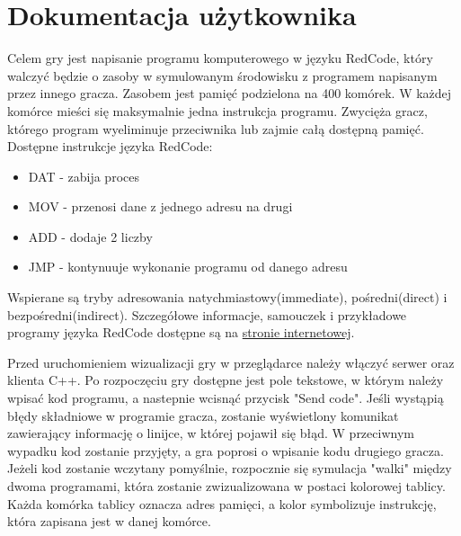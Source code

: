 \chapter{Dokumentacja użytkownika}
Celem gry jest napisanie programu komputerowego w języku RedCode, który walczyć będzie o zasoby w symulowanym środowisku z programem napisanym przez innego gracza. Zasobem jest pamięć podzielona na 400 komórek. W każdej komórce mieści się maksymalnie jedna instrukcja programu. Zwycięża gracz, którego program wyeliminuje przeciwnika lub zajmie całą dostępną pamięć.
Dostępne instrukcje języka RedCode:
\begin{itemize}
\item DAT - zabija proces
\item MOV - przenosi dane z jednego adresu na drugi
\item ADD - dodaje 2 liczby
\item JMP - kontynuuje wykonanie programu od danego adresu
\end{itemize}
Wspierane są tryby adresowania natychmiastowy(immediate), pośredni(direct) i bezpośredni(indirect). Szczegółowe informacje, samouczek i przykładowe programy języka RedCode dostępne są na \href{http://vyznev.net/corewar/guide.html}{stronie internetowej}.

Przed uruchomieniem wizualizacji gry w przeglądarce należy włączyć serwer oraz klienta C++. Po rozpoczęciu gry dostępne jest pole tekstowe, w którym należy wpisać kod programu, a nastepnie wcisnąć przycisk "Send code". Jeśli wystąpią błędy składniowe w programie gracza, zostanie wyświetlony komunikat zawierający informację o linijce, w której pojawił się błąd. W przeciwnym wypadku kod zostanie przyjęty, a gra poprosi o wpisanie kodu drugiego gracza. Jeżeli kod zostanie wczytany pomyślnie, rozpocznie się symulacja "walki" między dwoma programami, która zostanie zwizualizowana w postaci kolorowej tablicy. Każda komórka tablicy oznacza adres pamięci, a kolor symbolizuje instrukcję, która zapisana jest w danej komórce.